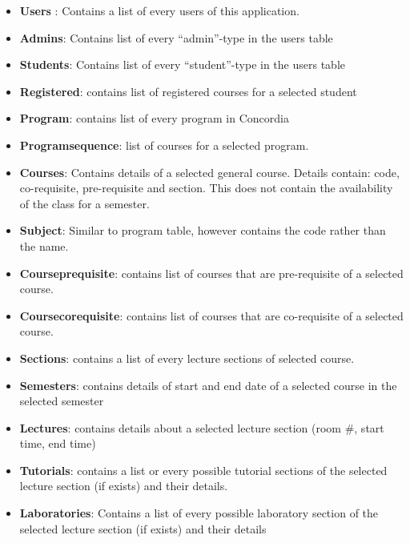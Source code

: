 \begin{itemize}
\item
  \textbf{Users} : Contains a list of every users of this application.
\item
  \textbf{Admins}: Contains list of every ``admin''-type in the users
  table
\item
  \textbf{Students}: Contains list of every ``student''-type in the
  users table
\item
  \textbf{Registered}: contains list of registered courses for a
  selected student
\item
  \textbf{Program}: contains list of every program in Concordia
\item
  \textbf{Programsequence}: list of courses for a selected program.
\item
  \textbf{Courses}: Contains details of a selected general course.
  Details contain: code, co-requisite, pre-requisite and section. This
  does not contain the availability of the class for a semester.
\item
  \textbf{Subject}: Similar to program table, however contains the code
  rather than the name.
\item
  \textbf{Courseprequisite}: contains list of courses that are
  pre-requisite of a selected course.
\item
  \textbf{Coursecorequisite}: contains list of courses that are
  co-requisite of a selected course.
\item
  \textbf{Sections}: contains a list of every lecture sections of
  selected course.
\item
  \textbf{Semesters}: contains details of start and end date of a
  selected course in the selected semester
\item
  \textbf{Lectures}: contains details about a selected lecture section
  (room \#, start time, end time)
\item
  \textbf{Tutorials}: contains a list or every possible tutorial
  sections of the selected lecture section (if exists) and their
  details.
\item
  \textbf{Laboratories}: Contains a list of every possible laboratory
  section of the selected lecture section (if exists) and their details
\end{itemize}
